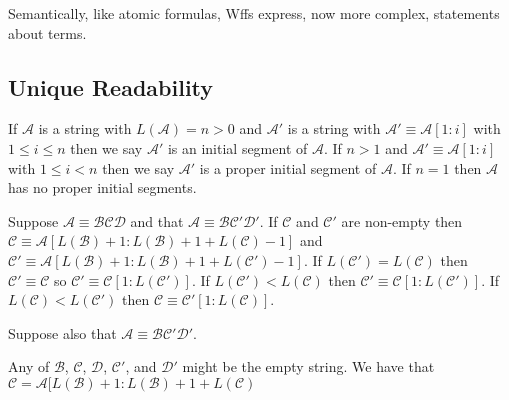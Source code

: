 \documentclass[12pt]{article}
\newcommand{\mc}[1]{\mathcal{#1}}
\begin{document}
Semantically, like atomic formulas, Wffs express, now more complex, statements about terms.

\subsection{Unique Readability}

If $\mc{A}$ is a string with $L(\mc{A}) = n > 0$ and $\mc{A}'$ is a string with $\mc{A}' \equiv \mc{A}[1:i]$ with $1\le i \le n$ then we say $\mc{A}'$ is an initial segment of $\mc{A}$.
If $n>1$ and $\mc{A}' \equiv \mc{A}[1:i]$ with $1 \le i < n$ then we say $\mc{A}'$ is a proper initial segment of $\mc{A}$.
If $n=1$ then $\mc{A}$ has no proper initial segments.

Suppose $\mc{A} \equiv \mc{B}\mc{C}\mc{D}$ and that $\mc{A} \equiv \mc{B}\mc{C}'\mc{D}'$.
If $\mc{C}$ and $\mc{C}'$ are non-empty then $\mc{C} \equiv \mc{A}[L(\mc{B}) + 1 : L(\mc{B}) + 1 + L(\mc{C}) - 1]$ and $\mc{C}' \equiv \mc{A}[L(\mc{B}) + 1 : L(\mc{B}) + 1 + L(\mc{C}') - 1]$.
If $L(\mc{C}') = L(\mc{C})$ then $\mc{C}' \equiv \mc{C}$ so $\mc{C}' \equiv \mc{C}[1:L(\mc{C}')]$.
If $L(\mc{C}') < L(\mc{C})$ then $\mc{C}' \equiv \mc{C}[1:L(\mc{C}')]$.
If $L(\mc{C}) < L(\mc{C}')$ then $\mc{C} \equiv \mc{C}'[1:L(\mc{C})]$.


Suppose also that $\mc{A} \equiv \mc{B}\mc{C}'\mc{D}'$.



Any of $\mc{B}$, $\mc{C}$, $\mc{D}$, $\mc{C}'$, and $\mc{D}'$ might be the empty string.
We have that $\mc{C} = \mc{A}[L(\mc{B})+1:L(\mc{B})+1+L(\mc{C})$
\end{document}
